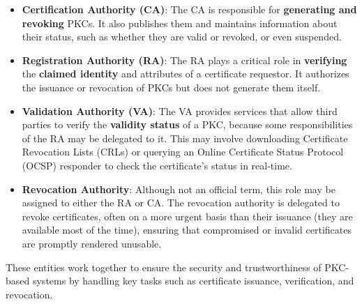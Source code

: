 \begin{itemize}
  \item \textbf{Certification Authority (CA)}: The CA is responsible
    for \textbf{generating and revoking} PKCs. It also publishes them
    and maintains information about their status, such as whether they
    are valid or revoked, or even suspended.
  \item \textbf{Registration Authority (RA)}: The RA plays a critical
    role in \textbf{verifying} the \textbf{claimed identity} and
    attributes of a certificate requestor. It authorizes the issuance
    or revocation of PKCs but does not generate them itself.
  \item \textbf{Validation Authority (VA)}: The VA provides services
    that allow third parties to verify the \textbf{validity status} of
    a PKC, because some responsibilities of the RA may be delegated to
    it. This may involve downloading Certificate Revocation Lists
    (CRLs) or querying an Online Certificate Status Protocol (OCSP)
    responder to check the certificate's status in real-time.
  \item \textbf{Revocation Authority}: Although not an official
    term, this role may be assigned to either the RA or CA. The
    revocation authority is delegated to revoke certificates, often
    on a more urgent basis than their issuance (they are available
    most of the time), ensuring that compromised or invalid
    certificates are promptly rendered unusable.
\end{itemize}

These entities work together to ensure the security and
trustworthiness of PKC-based systems by handling key tasks such as
certificate issuance, verification, and revocation.

